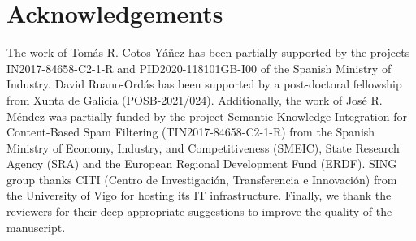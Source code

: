 \section{Acknowledgements}
The work of Tomás R. Cotos-Yáñez has been partially supported by the projects IN2017-84658-C2-1-R and PID2020-118101GB-I00 of the Spanish Ministry of Industry.
David Ruano-Ordás has been supported by a post-doctoral fellowship from Xunta de Galicia (POSB-2021/024). Additionally, the work of Jos\'e R. M\'endez was partially funded by the project Semantic Knowledge Integration for Content-Based Spam Filtering (TIN2017-84658-C2-1-R) from the Spanish Ministry of Economy, Industry, and Competitiveness (SMEIC), State Research Agency (SRA) and the European Regional Development Fund (ERDF).
SING group thanks CITI (Centro de Investigación, Transferencia e Innovación) from the University of Vigo for hosting its IT infrastructure. Finally, we thank the reviewers for their deep appropriate suggestions to improve the quality of the manuscript.



\address{Miguel Ferreiro-D\'iaz\\
	Department of Computer Science\\
	SING Research Group, University of Vigo, Spain\\
	CINBIO – Centro de Investigaciones Biom\'edicas, University of Vigo, Campus Universitario Lagoas-Marcosende, 36310 Vigo, Spain\\
	}

\address{Tomás R. Cotos-Yáñez\\
	Department of Statistics and Operations Research\\
	SiDOR Research Group, University of Vigo\\
	CINBIO – Centro de Investigaciones Biom\'edicas, University of Vigo, Campus Universitario Lagoas-Marcosende, 36310 Vigo, Spain\\
	ORCiD: 0000-0002-7732-6565\\
	}

\address{Jos\'e R. M\'endez\\
	Department of Computer Science\\
	SING Research Group, Galicia Sur Health Research Institute (IIS Galicia Sur), 
	SERGAS-UVIGO, Spain\\
	CINBIO – Centro de Investigaciones Biom\'edicas, University of Vigo, Campus Universitario Lagoas-Marcosende, 36310 Vigo, Spain\\
	ORCiD: 0000-0002-1935-4760\\
	}

\address{David Ruano-Ord\'as\\
	Department of Computer Science\\
	SING Research Group, Galicia Sur Health Research Institute (IIS Galicia Sur), 
	SERGAS-UVIGO, Spain\\
	CINBIO – Centro de Investigaciones Biom\'edicas, University of Vigo, Campus Universitario Lagoas-Marcosende, 36310 Vigo, Spain\\
	ORCiD: 0000-0002-6050-373X\\
	}